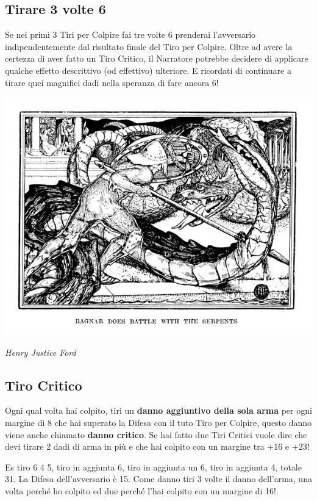 \begin{multicols}{2}
\subsection{Tirare 3 volte 6}\label{tiraretrevoltesei}

Se nei primi 3 Tiri per Colpire fai tre volte 6 prenderai l'avversario indipendentemente dal risultato finale del Tiro per Colpire. Oltre ad avere la certezza di aver fatto un Tiro Critico, il Narratore potrebbe decidere di applicare qualche effetto descrittivo (od effettivo) ulteriore. E ricordati di continuare a tirare quei magnifici dadi nella speranza di fare ancora 6!

\begin{center}
	\includegraphics[width=0.9\linewidth]{immagini/critico.png}

	\emph{Henry Justice Ford}
\end{center}

\subsection{Tiro Critico}\label{tirocritico}

Ogni qual volta hai colpito, tiri un \textbf{danno aggiuntivo della sola arma} per ogni margine di 8 che hai superato la Difesa con il tuto Tiro per Colpire, questo danno viene anche chiamato \textbf{danno critico}. Se hai fatto due Tiri Critici vuole dire che devi tirare 2 dadi di arma in più e che hai colpito con un margine tra +16 e +23!

\begin{giocatore}
Es tiro 6 4 5, tiro in aggiunta 6, tiro in aggiunta un 6, tiro in aggiunta 4, totale 31. La Difesa dell'avversario è 15. Come danno tiri 3 volte il danno dell'arma, una volta perché ho colpito ed due perché l'hai colpito con un margine di 16!.
\end{giocatore}



\end{multicols}
